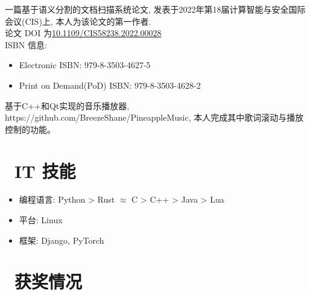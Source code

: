 \documentclass{resume}
\begin{document}
\begin{onehalfspacing}
一篇基于语义分割的文档扫描系统论文, 发表于2022年第18届计算智能与安全国际会议(CIS)上, 本人为该论文的第一作者. \\
论文 DOI 为\href{https://doi.org/10.1109/CIS58238.2022.00028}{10.1109/CIS58238.2022.00028} \\
ISBN 信息: 
\begin{itemize}
\item Electronic ISBN: 979-8-3503-4627-5
\item Print on Demand(PoD) ISBN: 979-8-3503-4628-2
\end{itemize}
\end{onehalfspacing}

\begin{onehalfspacing}
基于C++和Qt实现的音乐播放器, https://github.com/BreezeShane/PineappleMusic, 本人完成其中歌词滚动与播放控制的功能。
\end{onehalfspacing}


\section{\faCogs\ IT 技能}
\begin{itemize}[parsep=0.5ex]
  \item 编程语言: Python > Rust $\approx$ C > C++ > Java > Lua
  \item 平台: Linux
  \item 框架: Django, PyTorch
\end{itemize}

\section{\faHeartO\ 获奖情况}
\end{document}
